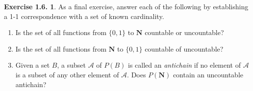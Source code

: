 \documentclass[12pt]{article}
\theoremstyle{definition}
\theoremstyle{exercise}
\newtheorem{exercise}{Exercise 1.6.}
\theoremstyle{solution}
\newcommand{\N}{\mathbf{N}}
\begin{document}
\begin{exercise}
\label{ex:10}
    As a final exercise, answer each of the following by establishing a 1-1 correspondence with a set of known cardinality.
    \begin{enumerate}
        \item Is the set of all functions from \( \{ 0, 1 \} \) to \( \N \) countable or uncountable?

        \item Is the set of all functions from \( \N \) to \( \{ 0, 1 \} \) countable of uncountable?

        \item Given a set \( B \), a subset \( \mathcal{A} \) of \( P(B) \) is called an \textit{antichain} if no element of \( \mathcal{A} \) is a subset of any other element of \( \mathcal{A} \). Does \( P(\N) \) contain an uncountable antichain?
    \end{enumerate}
\end{exercise}
\end{document}

